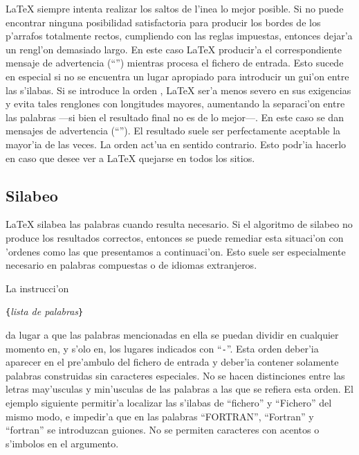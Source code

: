 \LaTeX{} siempre intenta realizar los saltos de l'inea lo mejor
posible. Si no puede encontrar ninguna posibilidad satisfactoria para
producir los bordes de los p'arrafos totalmente rectos, cumpliendo con
las reglas impuestas, entonces dejar'a un rengl'on demasiado largo.
En este caso \LaTeX{} producir'a el correspondiente mensaje de
advertencia (``'') mientras procesa el fichero de
entrada. Esto sucede en especial si no se encuentra un lugar apropiado
para introducir un gui'on entre las s'ilabas. Si se introduce la orden
, \LaTeX{} ser'a menos severo en sus exigencias y evita
tales renglones con longitudes mayores, aumentando la separaci'on
entre las palabras ---si bien el resultado final no es de lo mejor---.
En este caso se dan mensajes de advertencia (``''). El resultado suele ser perfectamente aceptable la mayor'ia
de las veces. La orden  act'ua en sentido contrario. Esto
podr'ia hacerlo en caso que desee ver a \LaTeX{} quejarse en todos los
sitios.


\subsection{Silabeo} \label{hyph}

\LaTeX{} silabea las palabras cuando resulta necesario. Si el
algoritmo de silabeo no produce los resultados correctos, entonces se
puede remediar esta situaci'on con 'ordenes como las que presentamos a
continuaci'on. Esto suele ser especialmente necesario en palabras
compuestas o de idiomas extranjeros.

La instrucci'on
\begin{command}
\verb|{|\emph{lista de palabras}\verb|}|
\end{command}
\noindent da lugar a que las palabras mencionadas en ella se puedan
dividir en cualquier momento en, y s'olo en, los lugares indicados con
``\verb|-|''\@. Esta orden deber'ia aparecer en el pre'ambulo del
fichero de entrada y deber'ia contener solamente palabras construidas
sin caracteres especiales.
No se hacen distinciones entre las letras may'usculas y min'usculas
de las palabras a las que se refiera esta orden. El ejemplo siguiente
permitir'a localizar las s'ilabas de ``fichero'' y ``Fichero'' del
mismo modo, e impedir'a que en las palabras ``FORTRAN'', ``Fortran'' y
``fortran'' se introduzcan guiones. No se permiten caracteres con
acentos o s'imbolos en el argumento.

